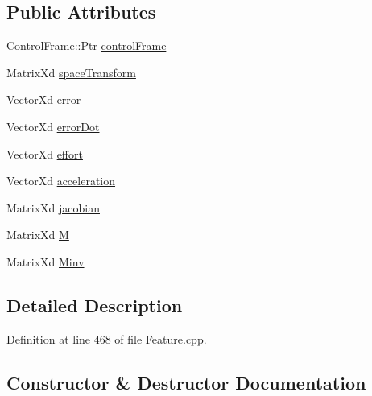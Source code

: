 \subsection*{Public Attributes}
\begin{DoxyCompactItemize}
\item 
Control\+Frame\+::\+Ptr \hyperlink{structocra_1_1OrientationFeature_1_1Pimpl_ace6d37214be072ece7305a45e35569c8}{control\+Frame}
\item 
Matrix\+Xd \hyperlink{structocra_1_1OrientationFeature_1_1Pimpl_aabbe93797831b01bda2453053e2a1224}{space\+Transform}
\item 
Vector\+Xd \hyperlink{structocra_1_1OrientationFeature_1_1Pimpl_ac388b9a7c770d1c5af07c5b8f011a430}{error}
\item 
Vector\+Xd \hyperlink{structocra_1_1OrientationFeature_1_1Pimpl_ad7b019fb36061c7906b7d68cd107a542}{error\+Dot}
\item 
Vector\+Xd \hyperlink{structocra_1_1OrientationFeature_1_1Pimpl_a4e6285f990db663f2c73f629ae854650}{effort}
\item 
Vector\+Xd \hyperlink{structocra_1_1OrientationFeature_1_1Pimpl_a71af076a18a38a72ec80d781b03b391b}{acceleration}
\item 
Matrix\+Xd \hyperlink{structocra_1_1OrientationFeature_1_1Pimpl_ae01a611368d744168c0b1cb036e9f3ca}{jacobian}
\item 
Matrix\+Xd \hyperlink{structocra_1_1OrientationFeature_1_1Pimpl_aad4500eb6e53d95fa7727e448616a312}{M}
\item 
Matrix\+Xd \hyperlink{structocra_1_1OrientationFeature_1_1Pimpl_a4d3638027be99fabf73eefd55015ce44}{Minv}
\end{DoxyCompactItemize}


\subsection{Detailed Description}


Definition at line 468 of file Feature.\+cpp.



\subsection{Constructor \& Destructor Documentation}
